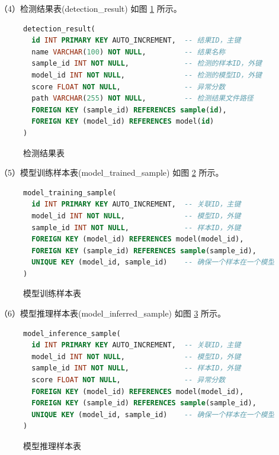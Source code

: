 \documentclass[
  ]{njuthesis}
\begin{document}
（4）检测结果表(detection\_result) 如图 \ref{检测结果表} 所示。

\begin{figure}[H]
    \centering
    \begin{minipage}{0.88\textwidth}
    {\linespread{1.2}
    \begin{lstlisting}[language=sql]
detection_result(
  id INT PRIMARY KEY AUTO_INCREMENT,  -- 结果ID，主键
  name VARCHAR(100) NOT NULL,         -- 结果名称
  sample_id INT NOT NULL,             -- 检测的样本ID，外键
  model_id INT NOT NULL,              -- 检测的模型ID，外键
  score FLOAT NOT NULL,               -- 异常分数
  path VARCHAR(255) NOT NULL,         -- 检测结果文件路径
  FOREIGN KEY (sample_id) REFERENCES sample(id),
  FOREIGN KEY (model_id) REFERENCES model(id)
)
    \end{lstlisting}}
    \end{minipage}
    \caption{检测结果表}
    \label{检测结果表}
\end{figure}

（5）模型训练样本表(model\_trained\_sample) 如图 \ref{模型训练样本表} 所示。

\begin{figure}[H]
    \centering
    \begin{minipage}{0.88\textwidth}
    {\linespread{1.2}
    \begin{lstlisting}[language=sql]
model_training_sample(
  id INT PRIMARY KEY AUTO_INCREMENT,  -- 关联ID，主键
  model_id INT NOT NULL,              -- 模型ID，外键
  sample_id INT NOT NULL,             -- 样本ID，外键
  FOREIGN KEY (model_id) REFERENCES model(model_id),
  FOREIGN KEY (sample_id) REFERENCES sample(sample_id),
  UNIQUE KEY (model_id, sample_id)    -- 确保一个样本在一个模型中只被训练一次
)
    \end{lstlisting}}
    \end{minipage}
    \caption{模型训练样本表}
    \label{模型训练样本表}
\end{figure}

（6）模型推理样本表(model\_inferred\_sample) 如图 \ref{模型推理样本表} 所示。

\begin{figure}[H]
    \centering
    \begin{minipage}{0.88\textwidth}
    {\linespread{1.2}
    \begin{lstlisting}[language=sql]
model_inference_sample(
  id INT PRIMARY KEY AUTO_INCREMENT,  -- 关联ID，主键
  model_id INT NOT NULL,              -- 模型ID，外键
  sample_id INT NOT NULL,             -- 样本ID，外键
  score FLOAT NOT NULL,               -- 异常分数
  FOREIGN KEY (model_id) REFERENCES model(model_id),
  FOREIGN KEY (sample_id) REFERENCES sample(sample_id),
  UNIQUE KEY (model_id, sample_id)    -- 确保一个样本在一个模型中只被记录一次
)
    \end{lstlisting}}
    \end{minipage}
    \caption{模型推理样本表}
    \label{模型推理样本表}
\end{figure}
\end{document}
